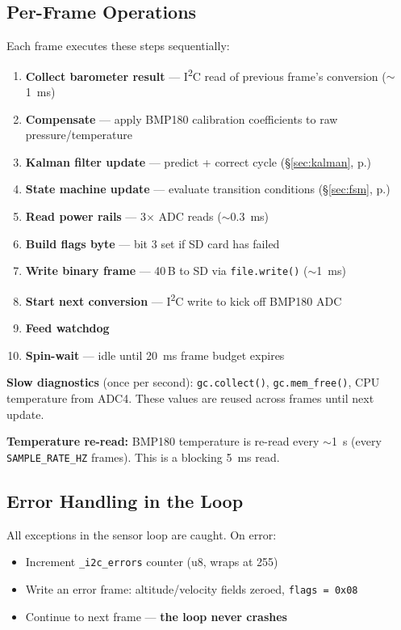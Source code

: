 \documentclass[11pt, a4paper, twoside]{article}
\newcommand{\config}[1]{\texttt{#1}}
\newcommand{\xref}[1]{(\S\ref{#1}, p.\pageref{#1})}
\begin{document}
\subsection{Per-Frame Operations}

Each frame executes these steps sequentially:

\begin{enumerate}
    \item \textbf{Collect barometer result} --- I\textsuperscript{2}C read of previous frame's conversion ($\sim$\SI{1}{\milli\second})
    \item \textbf{Compensate} --- apply BMP180 calibration coefficients to raw pressure/temperature
    \item \textbf{Kalman filter update} --- predict + correct cycle \xref{sec:kalman}
    \item \textbf{State machine update} --- evaluate transition conditions \xref{sec:fsm}
    \item \textbf{Read power rails} --- 3$\times$ ADC reads ($\sim$\SI{0.3}{\milli\second})
    \item \textbf{Build flags byte} --- bit 3 set if SD card has failed
    \item \textbf{Write binary frame} --- 40\,B to SD via \texttt{file.write()} ($\sim$\SI{1}{\milli\second})
    \item \textbf{Start next conversion} --- I\textsuperscript{2}C write to kick off BMP180 ADC
    \item \textbf{Feed watchdog}
    \item \textbf{Spin-wait} --- idle until \SI{20}{\milli\second} frame budget expires
\end{enumerate}

\textbf{Slow diagnostics} (once per second): \texttt{gc.collect()}, \texttt{gc.mem\_free()}, CPU temperature from ADC4. These values are reused across frames until next update.

\textbf{Temperature re-read:} BMP180 temperature is re-read every $\sim$\SI{1}{\second} (every \config{SAMPLE\_RATE\_HZ} frames). This is a blocking \SI{5}{\milli\second} read.

\subsection{Error Handling in the Loop}

All exceptions in the sensor loop are caught. On error:
\begin{itemize}
    \item Increment \texttt{\_i2c\_errors} counter (u8, wraps at 255)
    \item Write an error frame: altitude/velocity fields zeroed, \texttt{flags = 0x08}
    \item Continue to next frame --- \textbf{the loop never crashes}
\end{itemize}
\end{document}
